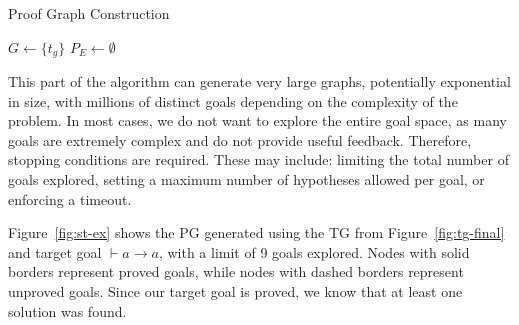 \begin{algorithm}
\caption{Proof Graph Construction}
\label{alg:pg-construction}

$G \leftarrow \{t_g\}$ 
$P_E \leftarrow \emptyset$ 

\end{algorithm}

This part of the algorithm can generate very large graphs, potentially exponential in size, with millions of distinct goals depending on the complexity of the problem. In most cases, we do not want to explore the entire goal space, as many goals are extremely complex and do not provide useful feedback. Therefore, stopping conditions are required. These may include: limiting the total number of goals explored, setting a maximum number of hypotheses allowed per goal, or enforcing a timeout.

Figure~\ref{fig:st-ex} shows the PG generated using the TG from Figure~\ref{fig:tg-final} and target goal \(\vdash a \to a\), with a limit of 9 goals explored. Nodes with solid borders represent proved goals, while nodes with dashed borders represent unproved goals. Since our target goal is proved, we know that at least one solution was found.

